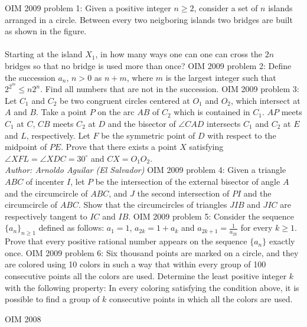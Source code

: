 OIM 2009 problem 1:  Given a positive integer $ n\geq 2$, consider a set of $ n$ islands arranged in a circle. Between every two neigboring islands two bridges are built as shown in the figure. \\\\
Starting at the island $ X_1$, in how many ways one can one can cross the $ 2n$ bridges so that no bridge is used more than once? 
OIM 2009 problem 2:  Define the succession $ a_n$, $ n>0$ as $ n+m$, where $ m$ is the largest integer such that $ 2^{2^m}\leq n2^n$. Find all numbers that are not in the succession. 
OIM 2009 problem 3:  Let $ C_1$ and $ C_2$ be two congruent circles centered at $ O_1$ and $ O_2$, which intersect at $ A$ and $ B$. Take a point $ P$ on the arc $ AB$ of $ C_2$ which is contained in $ C_1$. $ AP$ meets $ C_1$ at $ C$, $ CB$ meets $ C_2$ at $ D$ and the bisector of $ \angle CAD$ intersects $ C_1$ and $ C_2$ at $ E$ and $ L$, respectively. Let $ F$ be the symmetric point of $ D$ with respect to the midpoint of $ PE$. Prove that there exists a point $ X$ satisfying $ \angle XFL = \angle XDC = 30^\circ$ and $ CX = O_1O_2$. \\
\textit{
Author: Arnoldo Aguilar (El Salvador)} 
OIM 2009 problem 4:  Given a triangle $ ABC$ of incenter $ I$, let $ P$ be the intersection of the external bisector of angle $ A$ and the circumcircle of $ ABC$, and $ J$ the second intersection of $ PI$ and the circumcircle of $ ABC$. Show that the circumcircles of triangles $ JIB$ and $ JIC$ are respectively tangent to $ IC$ and $ IB$. 
OIM 2009 problem 5:  Consider the sequence $ \{a_n\}_{n\geq1}$ defined as follows: $ a_1 = 1$, $ a_{2k} = 1 + a_k$ and $ a_{2k + 1} = \frac {1}{a_{2k}}$ for every $ k\geq 1$. Prove that every positive rational number appears on the sequence $ \{a_n\}$ exactly once. 
OIM 2009 problem 6:  Six thousand points are marked on a circle, and they are colored using 10 colors in such a way that within every group of 100 consecutive points all the colors are used. Determine the least positive integer $ k$ with the following property: In every coloring satisfying the condition above, it is possible to find a group of $ k$ consecutive points in which all the colors are used. 

OIM 2008 

